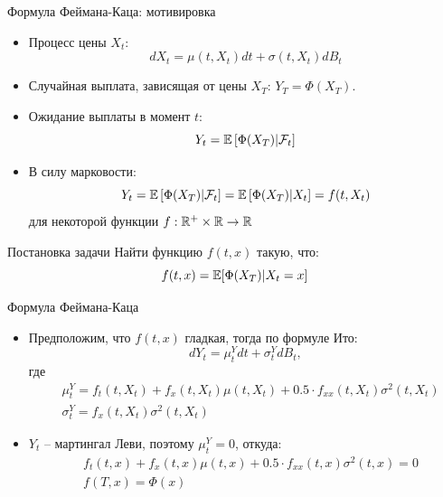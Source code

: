 \documentclass{beamer}
\begin{document}
\begin{frame}{Формула Феймана-Каца: мотивировка}
    \begin{itemize}
        \item Процесс цены $X_t$:
        $$
            dX_t = \mu(t, X_t) dt + \sigma(t, X_t) dB_t
        $$
        \item Случайная выплата, зависящая от цены $X_T$: $Y_T = \Phi(X_T)$.
        \item Ожидание выплаты в момент $t$:
        $$
            Y_t = \mathbb{E} \left[ \Phi(X_T) | \mathcal{F}_t \right]
        $$
        \item В силу марковости:
        $$
            Y_t = \mathbb{E} \left[ \Phi(X_T) | \mathcal{F}_t \right] = \mathbb{E} \left[ \Phi(X_T) | X_t \right] = f(t, X_t)
        $$для некоторой функции $f : \mathbb{R}^+\times \mathbb{R} \to \mathbb{R}$
    \end{itemize}

    \begin{block}{Постановка задачи}
        Найти функцию $f(t,x)$ такую, что:
        $$
            f(t, x) = \mathbb{E}[\Phi(X_T) | X_t=x]
        $$
    \end{block}

\end{frame}

\begin{frame}{Формула Феймана-Каца}
    \begin{itemize}
        \item Предположим, что $f(t, x)$ гладкая, тогда по формуле Ито:
        $$
            dY_t = \mu^Y_t dt + \sigma^Y_t dB_t,
        $$где \noident
        \begin{align*}
            &\mu^Y_t = f_t(t, X_t) + f_x(t, X_t) \mu(t, X_t) + 0.5 \cdot f_{xx}(t, X_t) \sigma^2(t,X_t) \\
            &\sigma_t^Y = f_x(t, X_t) \sigma^2(t, X_t) 
        \end{align*}
        \item $Y_t$ -- мартингал Леви, поэтому $\mu^Y_t = 0$, откуда:\noident
        \begin{align*}
            &f_t(t, x) + f_x(t, x) \mu(t, x) + 0.5 \cdot f_{xx}(t, x) \sigma^2(t, x) = 0 \\
            &f(T, x) = \Phi(x)
        \end{align*}
    \end{itemize}
\end{frame}
\end{document}
